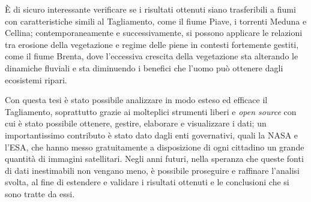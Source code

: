 È di sicuro interessante verificare se i risultati ottenuti siano trasferibili a fiumi con caratteristiche simili al Tagliamento, come il fiume Piave, i torrenti Meduna e Cellina; contemporaneamente e successivamente, si possono applicare le relazioni tra erosione della vegetazione e regime delle piene in contesti fortemente gestiti, come il fiume Brenta, dove l'eccessiva crescita della vegetazione sta alterando le dinamiche fluviali e sta diminuendo i benefici che l'uomo può ottenere dagli ecosistemi ripari.

Con questa tesi è stato possibile analizzare in modo esteso ed efficace il Tagliamento, soprattutto grazie ai molteplici strumenti liberi e \emph{open source} con cui è stato possibile ottenere, gestire, elaborare e visualizzare i dati;
un importantissimo contributo è stato dato dagli enti governativi, quali la NASA e l'ESA, che hanno messo gratuitamente a disposizione di ogni cittadino un grande quantità di immagini satellitari.
Negli anni futuri, nella speranza che queste fonti di dati inestimabili non vengano meno, è possibile proseguire e raffinare l'analisi svolta, al fine di estendere e validare i risultati ottenuti e le conclusioni che si sono tratte da essi.
